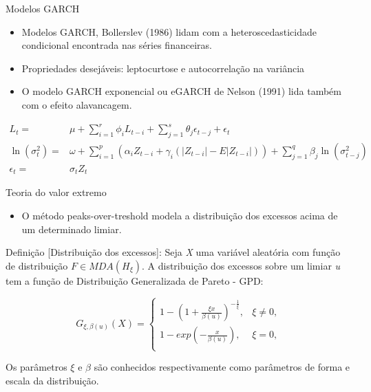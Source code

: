 \documentclass[ignorenonframetext,]{beamer}
\providecommand{\tightlist}{%
  \setlength{\itemsep}{0pt}\setlength{\parskip}{0pt}}
\begin{document}
\begin{frame}{Modelos GARCH}

\begin{itemize}
\item
  Modelos GARCH, Bollerslev (1986) lidam com a heteroscedasticidade
  condicional encontrada nas séries financeiras.
\item
  Propriedades desejáveis: leptocurtose e autocorrelação na variância
\item
  O modelo GARCH exponencial ou eGARCH de Nelson (1991) lida também com
  o efeito alavancagem.
\end{itemize}

\begin{align*}
    L_t=&\mu+ \sum_{i=1}^r\phi_i L_{t-i}+ \sum\limits_{j=1}^{s}\theta_j\epsilon_{t-j} +\epsilon_t \\
    \ln(\sigma_t^2)=&\omega+ \sum\limits_{i=1}^{p}(\alpha_i Z_{t-i}+ \gamma_i(|Z_{t-i}|-E|Z_{t-i}|))+ \sum\limits_{j=1}^{q}\beta_j \ln(\sigma_{t-j}^2) \\
    \epsilon_t=&\sigma_t Z_t
\end{align*}

\end{frame}

\begin{frame}{Teoria do valor extremo}

\begin{itemize}
\tightlist
\item
  O método peaks-over-treshold modela a distribuição dos excessos acima
  de um determinado limiar.
\end{itemize}

Definição {[}Distribuição dos excessos{]}: Seja \emph{X} uma variável
aleatória com função de distribuição \(F \in MDA(H_\xi)\). A
distribuição dos excessos sobre um limiar \emph{u} tem a função de
Distribuição Generalizada de Pareto - GPD:

\begin{equation*}
  G_{\xi,\beta(u)}(X) = 
  \begin{cases}
    1- \left(1+ \frac{\xi x}{\beta(u)} \right)^{-\frac{1}{\xi}}, & \xi \neq 0,\\
    1-exp\left(-\frac{x}{\beta(u)}\right), & \xi = 0,\\
  \end{cases}
\end{equation*}

Os parâmetros \(\xi\) e \(\beta\) são conhecidos respectivamente como
parâmetros de forma e escala da distribuição.

\end{frame}
\end{document}
